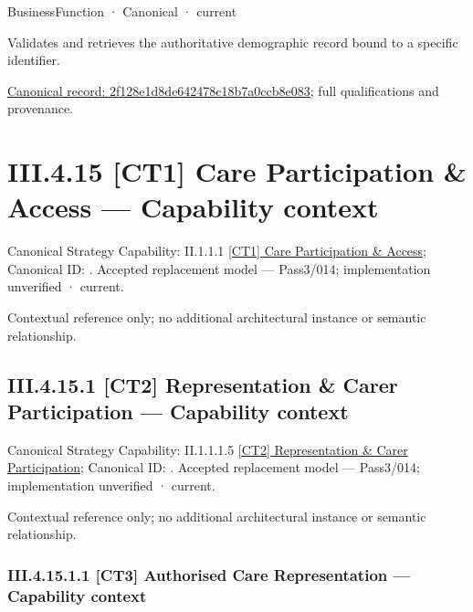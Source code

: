 \label{element:2f128e1d8de642478c18b7a0ccb8e083}
{\small BusinessFunction · Canonical · current}\par

Validates and retrieves the authoritative demographic record bound to a specific identifier.


{\footnotesize \href{../../../../continuum/business/business-function/2f128e1d8de642478c18b7a0ccb8e083.md}{Canonical record: 2f128e1d8de642478c18b7a0ccb8e083}; full qualifications and provenance.}\par
\section*{III.4.15 [CT1] Care Participation \& Access — Capability context}
\label{navigation:III.4.15}

{\small Canonical Strategy Capability: II.1.1.1 \hyperref[element:5b06afe075e44cc39236f628c5ada113]{[CT1] Care Participation \& Access}; Canonical ID: \texttt{}. Accepted replacement model — Pass3/014; implementation unverified · current.}\par
Contextual reference only; no additional architectural instance or semantic relationship.\par
\subsection*{III.4.15.1 [CT2] Representation \& Carer Participation — Capability context}
\label{navigation:III.4.15.1}

{\small Canonical Strategy Capability: II.1.1.1.5 \hyperref[element:0a8380fcfc2a4341927b409603a189f3]{[CT2] Representation \& Carer Participation}; Canonical ID: \texttt{}. Accepted replacement model — Pass3/014; implementation unverified · current.}\par
Contextual reference only; no additional architectural instance or semantic relationship.\par
\subsubsection*{III.4.15.1.1 [CT3] Authorised Care Representation — Capability context}
\label{navigation:III.4.15.1.1}

